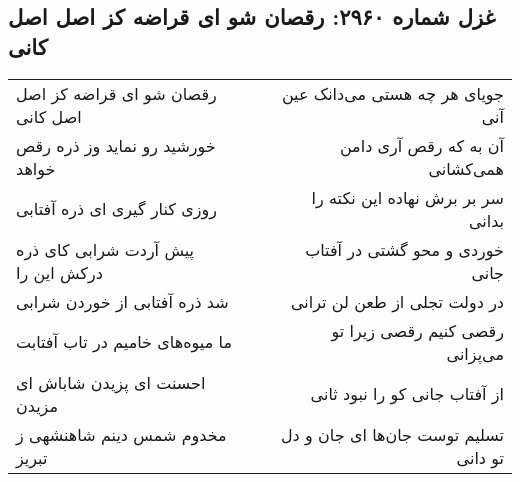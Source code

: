 \begin{center}
\section*{غزل شماره ۲۹۶۰: رقصان شو ای قراضه کز اصل اصل کانی}
\label{sec:2960}
\begin{longtable}{l p{0.5cm} r}
رقصان شو ای قراضه کز اصل اصل کانی
&&
جویای هر چه هستی می‌دانک عین آنی
\\
خورشید رو نماید وز ذره رقص خواهد
&&
آن به که رقص آری دامن همی‌کشانی
\\
روزی کنار گیری ای ذره آفتابی
&&
سر بر برش نهاده این نکته را بدانی
\\
پیش آردت شرابی کای ذره درکش این را
&&
خوردی و محو گشتی در آفتاب جانی
\\
شد ذره آفتابی از خوردن شرابی
&&
در دولت تجلی از طعن لن ترانی
\\
ما میوه‌های خامیم در تاب آفتابت
&&
رقصی کنیم رقصی زیرا تو می‌پزانی
\\
احسنت ای پزیدن شاباش ای مزیدن
&&
از آفتاب جانی کو را نبود ثانی
\\
مخدوم شمس دینم شاهنشهی ز تبریز
&&
تسلیم توست جان‌ها ای جان و دل تو دانی
\\
\end{longtable}
\end{center}
